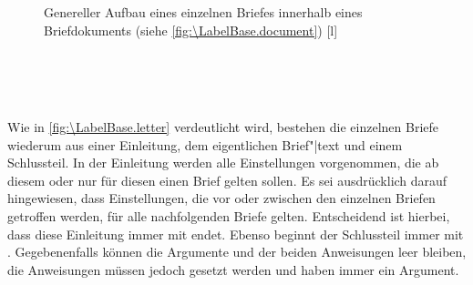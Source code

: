 \begin{figure}
  \setcapindent{0pt}%
  \begin{captionbeside}{Genereller Aufbau eines einzelnen Briefes
      innerhalb eines Briefdokuments (siehe
      \autoref{fig:\LabelBase.document})%
      \label{fig:\LabelBase.letter}}[l]
    \begin{minipage}[b]{.667\linewidth}%
      \centering\small\setlength{\fboxsep}{1.5ex}%
      \addtolength{\linewidth}{-\dimexpr2\fboxrule+2\fboxsep\relax}%
      \setlength{\topskip}{.5\topskip}%
      \\[1pt]
      \\[1pt]
      \\[\dimexpr\fboxsep+\fboxrule\relax]
    \end{minipage}
  \end{captionbeside}
\end{figure}

Wie in \autoref{fig:\LabelBase.letter} verdeutlicht wird, bestehen die
einzelnen Briefe wiederum aus einer Einleitung, dem eigentlichen Brief"|text
und einem Schlussteil. In der Einleitung werden alle Einstellungen
vorgenommen, die ab diesem oder nur für diesen einen Brief gelten sollen. Es
sei ausdrücklich darauf hingewiesen, dass Einstellungen, die vor oder zwischen
den einzelnen Briefen getroffen werden, für alle nachfolgenden Briefe
gelten. Entscheidend ist hierbei, dass diese Einleitung immer mit
 endet. Ebenso beginnt der
Schlussteil immer mit
. Gegebenenfalls können die
Argumente  und  der beiden Anweisungen leer
bleiben, die Anweisungen müssen jedoch gesetzt werden und haben immer ein
Argument.

